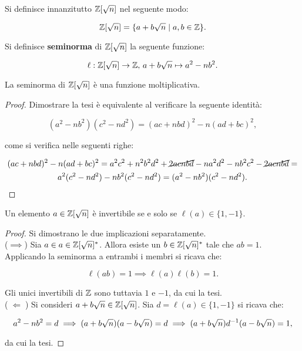 Si definisce innanzitutto $\mathbb Z[\sqrt{n}]$ nel seguente modo:

\[ \mathbb Z[\sqrt{n}] = \{ a + b\sqrt{n} \mid a, b \in \mathbb Z \}. \]

\begin{definition}
    Si definisce \textbf{seminorma} di $\mathbb Z[\sqrt{n}]$ la seguente
    funzione:
    
    \[ \ell : \mathbb Z[\sqrt{n}] \to \mathbb Z, \, a + b\sqrt{n} \mapsto a^2 - n b^2. \]
\end{definition}

\begin{proposition}
    La seminorma di $\mathbb Z[\sqrt{n}]$ è una funzione moltiplicativa.
\end{proposition}

\begin{proof}
    Dimostrare la tesi è equivalente al verificare la seguente identità:
    
    \[ (a^2-nb^2)(c^2-nd^2)=(ac+nbd)^2-n(ad+bc)^2, \]
    
    \vskip 0.1in
    
    come si verifica nelle seguenti righe:
    
    \begin{multline*}
        (ac+nbd)^2-n(ad+bc)^2 = a^2c^2+n^2b^2d^2+\cancel{2acnbd}-na^2d^2-nb^2c^2-\cancel{2acnbd} = \\
        a^2(c^2-nd^2) -nb^2(c^2-nd^2) = (a^2-nb^2)(c^2-nd^2).
    \end{multline*}
\end{proof}

\begin{theorem}
    \label{th:invertibili_z_sqrtn}
    Un elemento $a \in \mathbb Z[\sqrt{n}]$ è invertibile se e solo se
    $\ell(a) \in \{1, -1\}$.
\end{theorem}

\begin{proof}
    Si dimostrano le due implicazioni separatamente. \\
    
    ($\implies$) \; Sia $a \in a \in \mathbb Z[\sqrt{n}]^*$. Allora esiste un
    $b \in \mathbb Z[\sqrt{n}]^*$ tale che $ab = 1$. Applicando la seminorma
    a entrambi i membri si ricava che:
    
    \[ \ell(ab) = 1 \implies \ell(a)\ell(b) = 1. \]
    
    \vskip 0.1in
    
    Gli unici invertibili di $\mathbb Z$ sono tuttavia $1$ e $-1$,
    da cui la tesi. \\
    
    ($\;\Longleftarrow\;$) \; Si consideri $a+b\sqrt{n} \in \mathbb Z[\sqrt{n}]$.
    Sia $d = \ell(a) \in \{1, -1\}$ si ricava che:
    
    \[ a^2-nb^2 = d \implies (a+b\sqrt{n})(a-b\sqrt{n})=d \implies (a+b\sqrt{n})d^{-1}(a-b\sqrt{n})=1, \]
    
    \vskip 0.1in
    
    da cui la tesi.
\end{proof}

